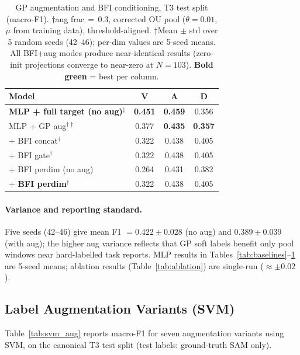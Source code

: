 \documentclass[sigconf,nonacm]{acmart}
\newcommand{\best}[1]{\textbf{\textcolor{bestcol}{#1}}}
\begin{document}
\begin{table}[t]
\caption{GP augmentation and BFI conditioning, T3 test split (macro-F1).
  $\dagger$aug frac\,$=$\,0.3, corrected OU pool ($\theta{=}0.01$, $\mu$ from
  training data), threshold-aligned.
  $\ddagger$Mean $\pm$ std over 5 random seeds (42--46); per-dim values are
  5-seed means.
  All BFI+aug modes produce near-identical results (zero-init projections
  converge to near-zero at $N=103$).
  \best{Bold green} = best per column.}
\label{tab:main}
\centering
\setlength{\tabcolsep}{4.5pt}
\begin{tabular}{lccc}
\toprule
\textbf{Model} & \textbf{V} & \textbf{A} & \textbf{D} \\
\midrule
\best{MLP + full target (no aug)$^\ddagger$} & \best{0.451} & \best{0.459} & 0.356 \\
MLP + GP aug$^{\dagger\ddagger}$     & 0.377 & \best{0.435} & \best{0.357} \\
\midrule
+ BFI concat$^\dagger$               & 0.322 & 0.438 & 0.405 \\
+ BFI gate$^\dagger$                 & 0.322 & 0.438 & 0.405 \\
+ BFI perdim (no aug)                & 0.264 & 0.431 & 0.382 \\
+ \textbf{BFI perdim}$^\dagger$      & 0.322 & 0.438 & 0.405 \\
\bottomrule
\end{tabular}
\end{table}

\paragraph{Variance and reporting standard.}
Five seeds (42--46) give mean F1 $= 0.422 \pm 0.028$ (no aug) and
$0.389 \pm 0.039$ (with aug); the higher aug variance reflects that GP soft
labels benefit only pool windows near hard-labelled task reports.
MLP results in Tables~\ref{tab:baselines}--\ref{tab:main} are 5-seed means;
ablation results (Table~\ref{tab:ablation}) are single-run ($\approx\pm0.02$).

\subsection{Label Augmentation Variants (SVM)}
\label{sec:aug_results}

Table~\ref{tab:svm_aug} reports macro-F1 for seven augmentation variants
using SVM, on the canonical T3 test split (test labels: ground-truth SAM only).
\end{document}
